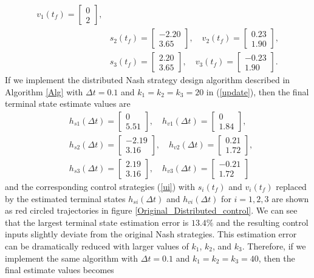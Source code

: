 \documentclass[12pt,draftcls,onecolumn]{IEEEtran}  %
\begin{document}
{\begin{align*}
v_1(t_f)=\begin{bmatrix}
0\\
2
\end{bmatrix},\\
&s_2(t_f)=\begin{bmatrix}
-2.20\\
    3.65
    \end{bmatrix},\quad
    v_2(t_f)=\begin{bmatrix}
0.23\\
    1.90
\end{bmatrix},\\
&s_3(t_f)=\begin{bmatrix}
 2.20\\
    3.65
    \end{bmatrix},\quad
    v_3(t_f)=\begin{bmatrix}
-0.23\\
    1.90
\end{bmatrix}.\end{align*}
If we implement the distributed Nash strategy design algorithm described in Algorithm \ref{Alg} with $\Delta t=0.1$ and $k_1=k_2=k_3=20$ in (\ref{update}), then the final terminal state estimate values are
\begin{align*}
&h_{s1}(\Delta t)=\begin{bmatrix}
 0\\
    5.51
\end{bmatrix},\quad h_{v1}(\Delta t)=\begin{bmatrix}
  0\\
    1.84
\end{bmatrix},\\
&h_{s2}(\Delta t)=\begin{bmatrix}
 -2.19\\    3.16
\end{bmatrix},\quad h_{v2}(\Delta t)=\begin{bmatrix}
 0.21\\1.72
\end{bmatrix},\\
&h_{s3}(\Delta t)=\begin{bmatrix}
 2.19\\3.16
\end{bmatrix},\quad h_{v3}(\Delta t)=\begin{bmatrix}
-0.21\\    1.72
\end{bmatrix}
\end{align*}
and the corresponding control strategies (\ref{ui}) with $s_i(t_f)$ and $v_i(t_f)$ replaced by the estimated terminal states $h_{si}(\Delta t)$ and $h_{vi}(\Delta t)$ for $i=1,2,3$ are shown as red circled trajectories in figure \ref{Original_Distributed_control}. We can see that the largest terminal state estimation error is $13.4\%$ and the resulting control inputs slightly deviate from the original Nash strategies. This estimation error can be dramatically reduced with larger values of $k_1$, $k_2$, and $k_3$. Therefore, if we implement the same algorithm with $\Delta t=0.1$ and $k_1=k_2=k_3=40$, then the final estimate values becomes
}
\end{document}
